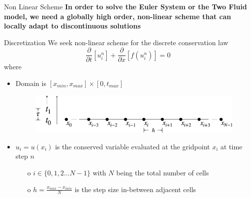 \documentclass[10pt]{beamer}
\begin{document}
\begin{frame}{Non Linear Scheme}
  \textbf{In order to solve the Euler System or the Two Fluid model, we need a globally high order, non-linear scheme that can locally adapt to discontinuous solutions}
\end{frame}


\begin{frame}{Discretization}
  We seek non-linear scheme for the discrete conservation law
  \begin{equation}
    \frac{\partial}{\partial t}[u_i^n] + \frac{\partial}{\partial x}[f(u_i^n)] = 0
  \end{equation}
  where 
  \begin{itemize}
    \item Domain is $[x_{min},x_{max}] \times [0,t_{max}]$
    \begin{figure}[H]
      \centering
      \includegraphics[scale=0.175]{GridGraphic_time.png}
    \end{figure}
    \item $u_i = u(x_i)$ is the conserved variable evaluated at the gridpoint $x_i$ at time step $n$
    \begin{itemize}
      \item[o]  $i \in \{0,1,2 \dots N-1\}$ with $N$ being the total number of cells
      \item[o] $h = \frac{x_{max} - x_{min}}{N}$ is the step size in-between adjacent cells
    \end{itemize}
  \end{itemize}
\end{frame}

\end{document}
